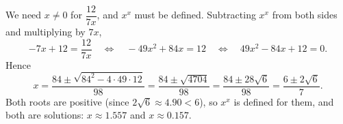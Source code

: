 We need $x\ne0$ for $\dfrac{12}{7x}$, and $x^x$ must be defined. Subtracting $x^x$ from both sides and multiplying by $7x$,
\[-7x+12=\dfrac{12}{7x}\quad\Longleftrightarrow\quad -49x^2+84x=12\quad\Longleftrightarrow\quad 49x^2-84x+12=0 .\]
Hence
\[x=\dfrac{84\pm\sqrt{84^2-4\cdot49\cdot12}}{98}=\dfrac{84\pm\sqrt{4704}}{98}=\dfrac{84\pm28\sqrt6}{98}=\boxed{\dfrac{6\pm2\sqrt6}{7}}.\]
Both roots are positive (since $2\sqrt6\approx4.90<6$), so $x^x$ is defined for them, and both are solutions: $x\approx1.557$ and $x\approx0.157$.
